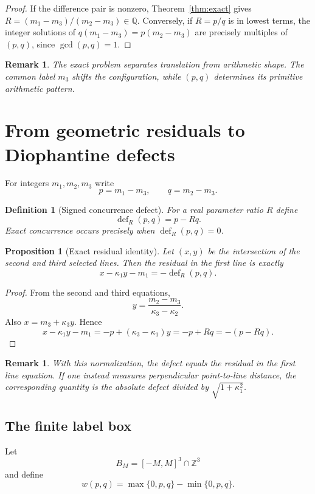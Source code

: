 \documentclass[11pt,a4paper]{article}
\newcommand{\defect}{\operatorname{def}}
\newtheorem{proposition}[theorem]{Proposition}
\newtheorem{definition}[theorem]{Definition}
\newtheorem{remark}[theorem]{Remark}
\begin{document}
\begin{proof}
If the difference pair is nonzero, Theorem~\ref{thm:exact} gives
$R=(m_1-m_3)/(m_2-m_3)\in\mathbb Q$. Conversely, if $R=p/q$ is in lowest terms, the integer solutions of $q(m_1-m_3)=p(m_2-m_3)$ are precisely multiples of $(p,q)$, since $\gcd(p,q)=1$.
\end{proof}

\begin{remark}
The exact problem separates translation from arithmetic shape. The common label $m_3$ shifts the
configuration, while $(p,q)$ determines its primitive arithmetic pattern.
\end{remark}

\section{From geometric residuals to Diophantine defects}
For integers $m_1,m_2,m_3$ write
\[
p=m_1-m_3,\qquad q=m_2-m_3.
\]

\begin{definition}[Signed concurrence defect]
For a real parameter ratio $R$ define
\[
\defect_R(p,q)=p-Rq.
\]
Exact concurrence occurs precisely when $\defect_R(p,q)=0$.
\end{definition}

\begin{proposition}[Exact residual identity]\label{prop:residual}
Let $(x,y)$ be the intersection of the second and third selected lines. Then the residual in the
first line is exactly
\[
\boxed{x-\kappa_1y-m_1=-\defect_R(p,q).}
\]
\end{proposition}

\begin{proof}
From the second and third equations,
\[
y=\frac{m_2-m_3}{\kappa_3-\kappa_2}.
\]
Also $x=m_3+\kappa_3y$. Hence
\[
x-\kappa_1y-m_1
=-p+(\kappa_3-\kappa_1)y
=-p+Rq
=-(p-Rq).
\]
\end{proof}

\begin{remark}
With this normalization, the defect equals the residual in the first line equation. If one instead measures perpendicular point-to-line distance, the corresponding quantity
is the absolute defect divided by $\sqrt{1+\kappa_1^2}$.
\end{remark}

\subsection{The finite label box}
Let
\[
B_M=[-M,M]^3\cap\mathbb Z^3
\]
and define
\[
w(p,q)=\max\{0,p,q\}-\min\{0,p,q\}.
\]
\end{document}
